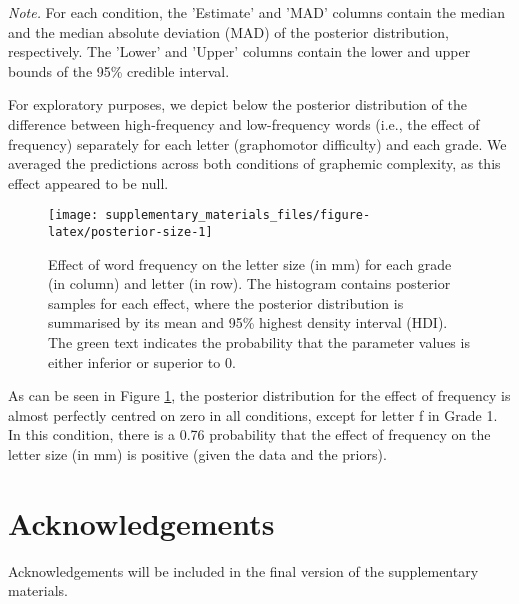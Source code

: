 \documentclass[
  11pt,
  english,
  ,doc,mask,floatsintext]{apa6}
\begin{document}
\begin{table}[htb]
\begin{center}
\begin{threeparttable}
{}

\begin{tablenotes}[para]
\normalsize{\textit{Note.} For each condition, the 'Estimate' and 'MAD' columns contain the
    median and the median absolute deviation (MAD) of the posterior distribution,
    respectively. The 'Lower' and 'Upper' columns contain the lower and upper
    bounds of the 95\% credible interval.}
\end{tablenotes}

\end{threeparttable}
\end{center}

\end{table}

For exploratory purposes, we depict below the posterior distribution of the difference between high-frequency and low-frequency words (i.e., the effect of frequency) separately for each letter (graphomotor difficulty) and each grade. We averaged the predictions across both conditions of graphemic complexity, as this effect appeared to be null.

\begin{figure}[!htb]

{\centering \texttt{[image: supplementary\_materials\_files/figure-latex/posterior-size-1]} 

}

\caption{Effect of word frequency on the letter size (in mm) for each grade (in column) and letter (in row). The histogram contains posterior samples for each effect, where the posterior distribution is summarised by its mean and 95\% highest density interval (HDI). The green text indicates the probability that the parameter values is either inferior or superior to 0.}\label{fig:posterior-size}
\end{figure}

As can be seen in Figure \ref{fig:posterior-size}, the posterior distribution for the effect of frequency is almost perfectly centred on zero in all conditions, except for letter f in Grade 1. In this condition, there is a 0.76 probability that the effect of frequency on the letter size (in mm) is positive (given the data and the priors).

\hypertarget{acknowledgements}{%
\section{Acknowledgements}\label{acknowledgements}}

Acknowledgements will be included in the final version of the supplementary materials.
\end{document}
